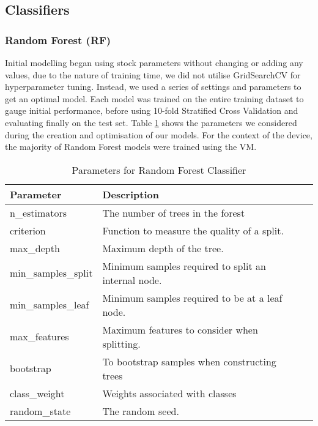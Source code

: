 \subsection{Classifiers}


\subsubsection{Random Forest (RF)}
\label{sec:RF}

Initial modelling began using stock parameters without changing or adding any values, due to the nature of training time, we did not utilise GridSearchCV for hyperparameter tuning. Instead, we used a series of settings and parameters to get an optimal model. Each model was trained on the entire training dataset to gauge initial performance, before using 10-fold Stratified Cross Validation and evaluating finally on the test set. Table \ref{tab:rf-params} shows the parameters we considered during the creation and optimisation of our models. For the context of the device, the majority of Random Forest models were trained using the VM.

\begin{table}[h]
\centering
\caption{Parameters for Random Forest Classifier}
\label{tab:rf-params}
\begin{tabular}{|l|l|l|}
\hline
\textbf{Parameter} & \textbf{Description} \\ \hline
n\_estimators & The number of trees in the forest\\
criterion & Function to measure the quality of a split.\\
max\_depth & Maximum depth of the tree. \\
min\_samples\_split & Minimum samples required to split an internal node. \\ 
min\_samples\_leaf & Minimum samples required to be at a leaf node. \\
max\_features & Maximum features to consider when splitting. \\
bootstrap & To bootstrap samples when constructing trees \\
class\_weight & Weights associated with classes \\
random\_state & The random seed.\\ \hline
\end{tabular}
\end{table}


